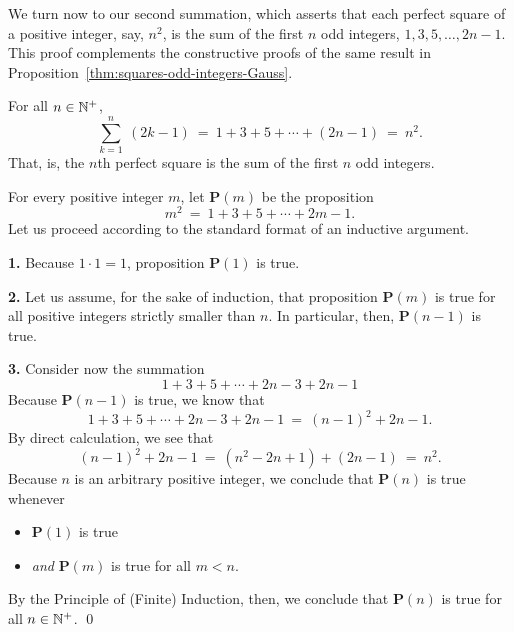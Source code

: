 \bigskip

We turn now to our second summation, which asserts that each perfect
square of a positive integer, say, $n^2$, is the sum of the first $n$
odd integers, $1, 3, 5, \ldots, 2n-1$.  This proof complements the
constructive proofs of the same result in
Proposition~\ref{thm:squares-odd-integers-Gauss}.

\begin{center}
\label{thm:squares-odd-integers-induction}
For all $n \in \mathbb{N}^+$,
\[
\sum_{k=1}^n \ (2k-1)
 \ = \ 1 + 3 + 5 + \cdots + (2n-1) \ = \ n^2.
\]
That, is, the $n$th perfect square is the sum of the first $n$ odd
integers.
\end{center}

%
For every positive integer $m$, let {\bf P}$(m)$ be the proposition
\[ m^2 \ = \ 1 + 3 + 5 + \cdots + 2m-1. \]
Let us proceed according to the standard format of an inductive
argument.

{\bf 1.} Because $1 \cdot 1 = 1$, proposition {\bf P}$(1)$ is true.

{\bf 2.} Let us assume, for the sake of induction, that proposition
{\bf P}$(m)$ is true for all positive integers strictly smaller than
$n$.  In particular, then, {\bf P}$(n-1)$ is true.

{\bf 3.} Consider now the summation
\[ 1 + 3 + 5 + \cdots + 2n-3 + 2n-1 \]
Because {\bf P}$(n-1)$ is true, we know that
\[ 1 + 3 + 5 + \cdots + 2n-3 + 2n-1 \ = \ (n-1)^2 + 2n-1.  \]
By direct calculation, we see that
\[ (n-1)^2 + 2n-1 \ = \ (n^2 -2n +1) + (2n-1) \ = \ n^2. \]
Because $n$ is an arbitrary positive integer, we conclude that
{\bf P}$(n)$ is true whenever
\begin{itemize}
\item
{\bf P}$(1)$ is true
\item
{\em and}
{\bf P}$(m)$ is true for all $m < n$.
\end{itemize}
By the Principle of (Finite) Induction, then, we conclude that {\bf
  P}$(n)$ is true for all $n \in \mathbb{N}^+$.
\qed


